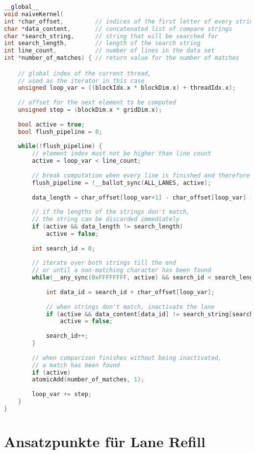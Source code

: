 \begin{lstlisting}[language=C++,
	caption=Naive Implementierung des String-Vergleichs,
	label=naive_equals]
__global__
void naiveKernel(
int *char_offset,         // indices of the first letter of every string
char *data_content,       // concatenated list of compare strings 
char *search_string,      // string that will be searched for
int search_length,        // length of the search string
int line_count,           // number of lines in the data set
int *number_of_matches) { // return value for the number of matches

	// global index of the current thread,
	// used as the iterator in this case
	unsigned loop_var = ((blockIdx.x * blockDim.x) + threadIdx.x);
	
	// offset for the next element to be computed
	unsigned step = (blockDim.x * gridDim.x);
	
	bool active = true;
	bool flush_pipeline = 0;
	
	while(!flush_pipeline) {
		// element index must not be higher than line count
		active = loop_var < line_count;
		
		// break computation when every line is finished and therefore inactive
		flush_pipeline = !__ballot_sync(ALL_LANES, active);
		
		data_length = char_offset[loop_var+1] - char_offset[loop_var] - 1;
		
		// if the lengths of the strings don't match,
		// the string can be discarded immediately
		if (active && data_length != search_length)
			active = false;
		
		int search_id = 0;
		
		// iterate over both strings till the end
		// or until a non-matching character has been found
		while(__any_sync(0xFFFFFFFF, active) && search_id < search_length) {
		
			int data_id = search_id + char_offset[loop_var];
			
			// when strings don't match, inactivate the lane
			if (active && data_content[data_id] != search_string[search_id])
				active = false;
			
			search_id++;
		}
		
		// when comparison finishes without being inactivated, 
		// a match has been found 
		if (active)
		atomicAdd(number_of_matches, 1);
		
		loop_var += step;
	}
}
\end{lstlisting}

\section{Ansatzpunkte für Lane Refill}

